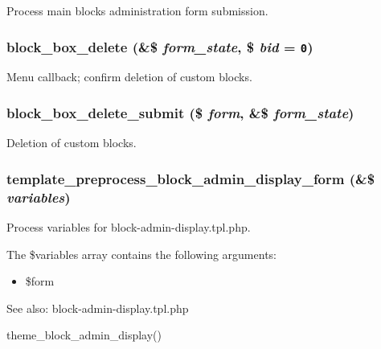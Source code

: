 Process main blocks administration form submission. \hypertarget{block_8admin_8inc_12e1e06e9bedb58ee6e14314ad211caf}{
\subsubsection[{block\_\-box\_\-delete}]{\setlength{\rightskip}{0pt plus 5cm}block\_\-box\_\-delete (\&\$ {\em form\_\-state}, \/  \$ {\em bid} = {\tt 0})}}
\label{block_8admin_8inc_12e1e06e9bedb58ee6e14314ad211caf}


Menu callback; confirm deletion of custom blocks. \hypertarget{block_8admin_8inc_40e3265df938e03fb4eada48e559a109}{
\subsubsection[{block\_\-box\_\-delete\_\-submit}]{\setlength{\rightskip}{0pt plus 5cm}block\_\-box\_\-delete\_\-submit (\$ {\em form}, \/  \&\$ {\em form\_\-state})}}
\label{block_8admin_8inc_40e3265df938e03fb4eada48e559a109}


Deletion of custom blocks. \hypertarget{block_8admin_8inc_790da1d1c8cea6bceca5374a4e410c01}{
\subsubsection[{template\_\-preprocess\_\-block\_\-admin\_\-display\_\-form}]{\setlength{\rightskip}{0pt plus 5cm}template\_\-preprocess\_\-block\_\-admin\_\-display\_\-form (\&\$ {\em variables})}}
\label{block_8admin_8inc_790da1d1c8cea6bceca5374a4e410c01}


Process variables for block-admin-display.tpl.php.

The \$variables array contains the following arguments:\begin{itemize}
\item \$form\end{itemize}


\begin{Desc}
\item[See also:]block-admin-display.tpl.php 

theme\_\-block\_\-admin\_\-display() \end{Desc}

